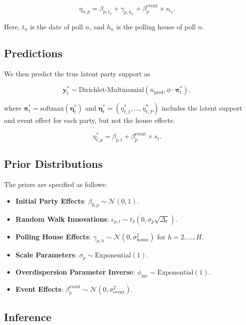 \documentclass[
  letterpaper,
  DIV=11,
  numbers=noendperiod]{scrartcl}
\providecommand{\tightlist}{%
  \setlength{\itemsep}{0pt}\setlength{\parskip}{0pt}}\usepackage{longtable,booktabs,array}
\begin{document}
\[
\eta_{n,p} = \beta_{p, t_n} + \gamma_{p, h_n} + \beta^{\text{event}}_p \times s_{t_n}.
\]

Here, \(t_n\) is the date of poll \(n\), and \(h_n\) is the polling
house of poll \(n\).

\subsection{Predictions}\label{predictions}

We then predict the true latent party support as

\[
\mathbf{y}^*_{t} \sim \text{Dirichlet-Multinomial}\left(n_{\text{pred}}, \phi \cdot \boldsymbol{\pi}^*_{t}\right),
\]

where
\(\boldsymbol{\pi}^*_{t} = \text{softmax}\left(\boldsymbol{\eta}^*_{t}\right)\)
and
\(\boldsymbol{\eta}^*_{t} = \left(\eta_{t,1}^*, \dots, \eta_{t,P}^*\right)\)
includes the latent support and event effect for each party, but not the
house effects:

\[
\eta_{t,p}^* = \beta_{p, t} + \beta^{\text{event}}_p \times s_{t}.
\]

\subsection{Prior Distributions}\label{prior-distributions}

The priors are specified as follows:

\begin{itemize}
\tightlist
\item
  \textbf{Initial Party Effects}:
  \(\beta_{0,p} \sim \mathcal{N}(0, 1)\).
\item
  \textbf{Random Walk Innovations}:
  \(\epsilon_{p,t} \sim t_3\left(0, \sigma_p \sqrt{\Delta_t}\right)\).
\item
  \textbf{Polling House Effects}:
  \(\gamma_{p,h} \sim \mathcal{N}\left(0, \sigma_{\text{house}}^2\right)\)
  for \(h = 2, \dots, H\).
\item
  \textbf{Scale Parameters}: \(\sigma_p \sim \text{Exponential}(1)\).
\item
  \textbf{Overdispersion Parameter Inverse}:
  \(\phi_{\text{inv}} \sim \text{Exponential}(1)\).
\item
  \textbf{Event Effects}:
  \(\beta^{\text{event}}_p \sim \mathcal{N}\left(0, \sigma_{\text{event}}^2\right)\).
\end{itemize}

\subsection{Inference}\label{inference}
\end{document}
